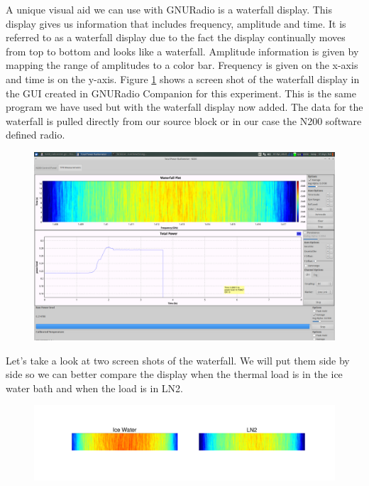 {A unique visual aid we can use with GNURadio is a waterfall display.  This display gives us information that includes frequency, amplitude and time.  It is referred to as a waterfall display due to the fact the display continually moves from top to bottom and looks like a waterfall.  Amplitude information is given by mapping the range of amplitudes to a color bar.  Frequency is given on the x-axis and time is on the y-axis.  Figure \ref{LN2_waterfall} shows a screen shot of the waterfall display in the GUI created in GNURadio Companion for this experiment.  This is the same program we have used but with the waterfall display now added.  The data for the waterfall is pulled directly from our source block or in our case the N200 software defined radio.

\begin{figure}[h!tb] \centering

\includegraphics[width=\textwidth]{Experiments/Exp1/LN2_waterfall.png}

\label{LN2_waterfall}
\end{figure}

Let's take a look at two screen shots of the waterfall.  We will put them side by side so we can better compare the display when the thermal load is in the ice water bath and when the load is in LN2.

\begin{figure}[h!tb] \centering

\includegraphics[width=\textwidth]{Experiments/Exp1/waterfall_side.pdf}


\end{figure}}
